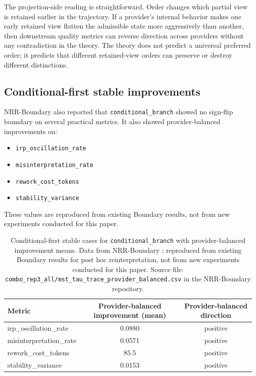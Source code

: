 \documentclass[11pt,a4paper]{article}
\begin{document}
The projection-side reading is straightforward. Order changes which partial view is retained earlier in the trajectory. If a provider's internal behavior makes one early retained view flatten the admissible state more aggressively than another, then downstream quality metrics can reverse direction across providers without any contradiction in the theory. The theory does not predict a universal preferred order; it predicts that different retained-view orders can preserve or destroy different distinctions.

\subsection{Conditional-first stable improvements}

NRR-Boundary \cite{saito2026boundary} also reported that \texttt{conditional\_branch} showed no sign-flip boundary on several practical metrics. It also showed provider-balanced improvements on:
\begin{itemize}
  \item \texttt{irp\_oscillation\_rate}
  \item \texttt{misinterpretation\_rate}
  \item \texttt{rework\_cost\_tokens}
  \item \texttt{stability\_variance}
\end{itemize}

These values are reproduced from existing Boundary results, not from new experiments conducted for this paper.

\begin{table}[h]
\centering
\small
\begin{tabular}{p{4.3cm}cc}
\toprule
Metric & Provider-balanced improvement (mean) & Provider-balanced direction \\
\midrule
irp\_oscillation\_rate & 0.0880 & positive \\
misinterpretation\_rate & 0.0571 & positive \\
rework\_cost\_tokens & 85.5 & positive \\
stability\_variance & 0.0153 & positive \\
\bottomrule
\end{tabular}
\caption{Conditional-first stable cases for \texttt{conditional\_branch} with provider-balanced improvement means. Data from NRR-Boundary \cite{saito2026boundary}; reproduced from existing Boundary results for post hoc reinterpretation, not from new experiments conducted for this paper. Source file: \texttt{combo\_rep3\_all/mst\_tau\_trace\_provider\_balanced.csv} in the NRR-Boundary repository.}
\label{tab:boundary_conditional_first}
\end{table}
\end{document}
